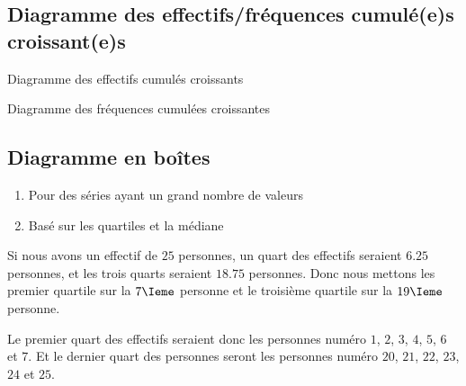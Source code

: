 \subsection{Diagramme des effectifs/fréquences cumulé(e)s croissant(e)s}

\begin{multicols}{2}
  \begin{center}
    
    Diagramme des effectifs cumulés croissants    
  \end{center}

  \columnbreak
  \begin{center}

    Diagramme des fréquences cumulées croissantes
  \end{center}
\end{multicols}



\subsection{Diagramme en boîtes}

\begin{enumerate}
\item Pour des séries ayant un grand nombre de valeurs
\item Basé sur les quartiles et la médiane
\end{enumerate}

\begin{center}
\end{center}

\begin{example}
    Si nous avons un effectif de \( 25\) personnes, un quart des effectifs seraient \( 6.25\) personnes, et les trois quarts seraient \( 18.75\) personnes. Donc nous mettons les premier quartile sur la \( 7\Ieme\) personne et le troisième quartile sur la \( 19\Ieme\) personne.

    Le premier quart des effectifs seraient donc les personnes numéro \( 1\), \( 2\), \( 3\), \( 4\), \( 5\), \( 6\) et \( 7\). Et le dernier quart des personnes seront les personnes numéro \( 20\), \( 21\), \( 22\), \( 23\), \( 24\) et \( 25\).
\end{example}
